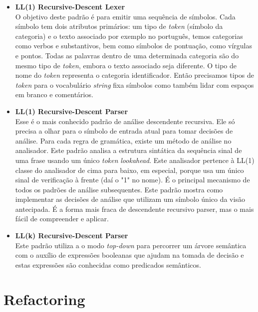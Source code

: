 \begin{itemize}
	\item \textbf{LL(1) Recursive-Descent Lexer}\\
	O objetivo deste padr\~{a}o \'{e} para emitir uma sequência de s\'{i}mbolos. Cada s\'{i}mbolo tem dois atributos prim\'{a}rios: um tipo de \textit{token} (s\'{i}mbolo da categoria) e o texto associado por exemplo 
	no português, temos categorias como verbos e substantivos, bem como s\'{i}mbolos de pontua\c{c}\~{a}o, como v\'{i}rgulas e pontos. Todas as palavras dentro de uma determinada categoria s\~{a}o do mesmo tipo de \textit{token}, embora o texto associado seja diferente. O tipo de nome do \textit{token} representa o categoria identificador. Ent\~{a}o precisamos tipos de \textit{token} para o vocabul\'{a}rio \textit{string} fixa s\'{i}mbolos como tamb\'{e}m lidar com espa\c{c}os em branco e coment\'{a}rios.
	\item \textbf{LL(1) Recursive-Descent Parser}\\
	Esse \'{e} o mais conhecido padr\~{a}o de an\'{a}lise descendente recursiva. Ele s\'{o} precisa	a olhar para o s\'{i}mbolo de entrada atual para tomar decis\~{o}es de an\'{a}lise. Para cada regra de gram\'{a}tica, existe um m\'{e}todo de an\'{a}lise no analisador. Este padr\~{a}o analisa a estrutura sint\'{a}tica da sequência sinal de uma frase usando um \'{u}nico \textit{token} \textit{lookahead}. Este analisador pertence à LL(1) classe do analisador de cima para baixo, em especial, porque usa um \'{u}nico sinal de verifica\c{c}\~{a}o à frente (da\'{i} o "1" no nome). É o principal mecanismo de todos os padr\~{o}es de an\'{a}lise subsequentes. Este padr\~{a}o mostra como implementar as decis\~{o}es de an\'{a}lise que utilizam um s\'{i}mbolo \'{u}nico da vis\~{a}o antecipada. É a forma mais fraca de descendente recursivo parser, mas o mais f\'{a}cil de compreender e aplicar.
	\item \textbf{LL(k) Recursive-Descent Parser}\\
	Este padr\~{a}o utiliza a o modo \textit{top-down} para percorrer um \'{a}rvore sem\^{a}ntica com o aux\'{i}lio de express\~{o}es booleanas que ajudam na tomada de decis\~{a}o e estas express\~{o}es s\~{a}o conhecidas como predicados sem\^{a}nticos.
\end{itemize}




\section{Refactoring}\label{sec:refactoring}

